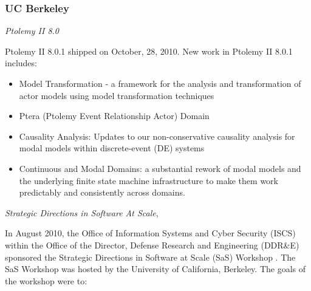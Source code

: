 \subsubsection{UC Berkeley}

\emph{Ptolemy II 8.0}

                 Ptolemy II 8.0.1 \cite{PtolemyII801} shipped on October, 28, 2010.  New work in Ptolemy II 8.0.1 includes:
                 \begin{itemize}
                 \item Model Transformation - a framework for the analysis and transformation of actor models using model transformation techniques 
                 \item Ptera (Ptolemy Event Relationship Actor) Domain 
                 \item Causality Analysis: Updates to our non-conservative causality analysis for modal models within discrete-event (DE) systems 
                 \item Continuous and Modal Domains: a substantial rework of modal models and the underlying finite state machine infrastructure to make them work predictably and consistently across domains. 
                 \end{itemize}

\noindent \emph{Strategic Directions in Software At Scale},

                 In August 2010, the Office of Information Systems and Cyber Security (ISCS) within the Office of the Director, Defense Research and Engineering (DDR\&E) sponsored the Strategic Directions in Software at Scale (SaS) Workshop \cite{MayLeeJones11_StrategicDirectionsInSoftwareAtScale}. The SaS Workshop was hosted by the University of California, Berkeley. The goals of the workshop were to:
                 
